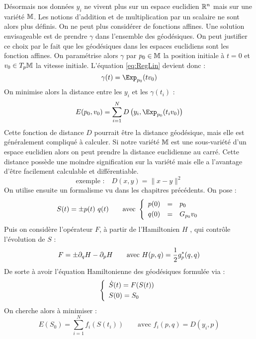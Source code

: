 Désormais nos données $y_i$ ne vivent plus sur un espace euclidien $\R^n$ mais sur une variété $\M$. Les notions d'addition et de multiplication par un scalaire ne sont alors plus définis. On ne peut plus considérer de fonctions affines. Une solution envisageable est de prendre $\gamma$ dans l'ensemble des géodésiques. On peut justifier ce choix par le fait que les géodésiques dans les espaces euclidiens sont les fonction affines. On paramétrise alors $\gamma$ par $p_0 \in \M$ la position initiale à $t=0$ et $v_0 \in T_p \M$ la vitesse initiale. L'équation \eqref{eq:RegLin} devient donc :
\begin{equation}
	\gamma(t) = \Exp_{p_0} (t v_0)
\end{equation}
On minimise alors la distance entre les $y_i$ et les $\gamma(t_i)$ :
$$ E(p_0, v_0) = \sum_{i=1}^N D \left( y_i, \Exp_{p_0}(t_i v_0) \right) $$
Cette fonction de distance $D$ pourrait être la distance géodésique, mais elle est généralement compliqué à calculer. Si notre variété $\M$ est une sous-variété d'un espace euclidien alors on peut prendre la distance euclidienne au carré. Cette distance possède une moindre signification sur la variété mais elle a l'avantage d'être facilement calculable et différentiable.
$$ \text{exemple :} \quad D(x, y) = \| x - y \|^2 $$
On utilise ensuite un formalisme vu dans les chapitres précédents. On pose :
\begin{equation}
	S(t) = \pm{p(t) \\[1mm]\ q(t)} \qquad \text{avec } \syst{lll}{p(0) & = & p_0 \\[1mm] q(0) & = & G_{p_0} v_0}
\end{equation}
Puis on considère l'opérateur $F$, à partir de l'Hamiltonien $H$ , qui contrôle l'évolution de $S$ :
\begin{equation}
	\label{eq:op_F}
	F = \pm{\partial_q H \\[1mm] - \partial_p H} \qquad \text{avec } H(p, q) = \frac{1}{2} g_p^*(q, q)
\end{equation}
De sorte à avoir l'équation Hamiltonienne des géodésiques  formulée via :
\begin{equation}
	\label{eq:evol_S}
	\syst{lll}{
		\dot{S}(t) = F(S(t)) \\[1mm]
		S(0) = S_0
	}
\end{equation}
On cherche alors à minimiser :
\begin{equation}
	E(S_0) = \sum_{i=1}^N f_i(S(t_i)) \qquad \text{avec } f_i(p, q) = D(y_i, p)
\end{equation}
